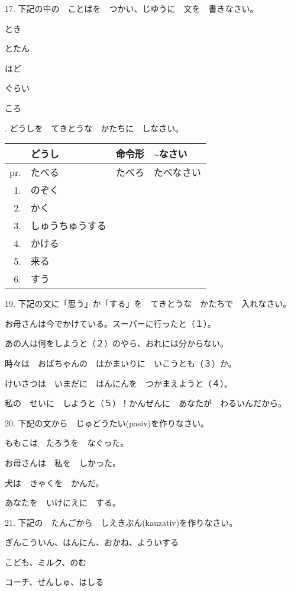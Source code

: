 	\begin{mondai}{17. 下記の中の　ことばを　つかい、じゆうに　文を　書きなさい。}
		\item とき
		\item とたん
		\item ほど
		\item ぐらい
		\item ころ
	\end{mondai}

	\newpage
	. どうしを　てきとうな　かたちに　しなさい。
	
	\vspace{5pt}
	\begin{tabular}{r p{100pt} p{100pt} p{100pt}}
		& どうし & 命令形 & \textasciitilde なさい\\\hline
		pr. & たべる & たべろ & たべなさい\\\hline
		1. & のぞく &  & \\\hline
		2. & かく &  & \\\hline
		3. & しゅうちゅうする &  & \\\hline
		4. & かける &  & \\\hline
		5. & 来る &  & \\\hline
		6. & すう &  & \\
	\end{tabular}

	\begin{mondai}{19. 下記の文に「思う」か「する」を　てきとうな　かたちで　入れなさい。}
		\item お母さんは今でかけている。スーパーに行ったと（１）。
		\item あの人は何をしようと（２）のやら、おれには分からない。
		\item 時々は　おばちゃんの　はかまいりに　いこうとも（３）か。
		\item けいさつは　いまだに　はんにんを　つかまえようと（４）。
		\item 私の　せいに　しようと（５）！かんぜんに　あなたが　わるいんだから。
	\end{mondai}

	\begin{mondai}{20. 下記の文から　じゅどうたい(pasiv)を作りなさい。}
		\item ももこは　たろうを　なぐった。
		\item お母さんは　私を　しかった。
		\item 犬は　きゃくを　かんだ。
		\item あなたを　いけにえに　する。
	\end{mondai}

	\begin{mondai}{21. 下記の　たんごから　しえきぶん(kauzativ)を作りなさい。}
		\item ぎんこういん、はんにん、おかね、よういする
		\item こども、ミルク、のむ
		\item コーチ、せんしゅ、はしる
	\end{mondai}
